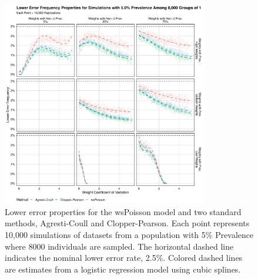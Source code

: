 \documentclass[AMA,STIX1COL]{WileyNJD-v2}
\begin{document}
\begin{figure}
\centering
\includegraphics[width=0.8\textwidth]{figures/perfect_lower_error_frequency_8000_groups_0_05_prev.pdf}
\caption{Lower error properties for the wsPoisson model and two standard methods, Agresti-Coull and Clopper-Pearson.
Each point represents 10,000 simulations of datasets from a population with 5\% Prevalence where 8000 individuals are sampled.
The horizontal dashed line indicates the nominal lower error rate, 2.5\%.
Colored dashed lines are estimates from a logistic regression model using cubic splines.}
\label{fig:perfect_lower_error_frequency_8000_groups_0_05_prev}
\end{figure}
\end{document}
